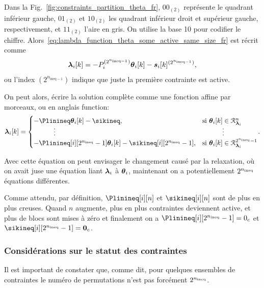 \documentclass[../main.tex]{subfiles}
\begin{document}
Dans la Fig.~\ref{fig:constraints_partition_theta_fr}, ${00}_{(2)}$ représente le quadrant inférieur gauche, ${01}_{(2)}$ et ${10}_{(2)}$ les quadrant inférieur droit et supérieur gauche, respectivement, et ${11}_{(2)}$ l'aire en gris.
On utilise la base 10 pour codifier le chiffre.
Alors~\eqref{eq:lambda_function_theta_some_active_same_size_fr} est récrit comme
\begin{equation}
  \label{eq:lambda_function_theta_same_size_coded}
  \lambdaik=-\Plin^{(2^{n_{\text{ineq}-1}})}\thetaik-\sik^{(2^{n_{\text{ineq}-1}})},
\end{equation}
ou l'index $(2^{n_{\text{ineq}-1}})$ indique que juste la première contrainte est active.

On peut alors, écrire la solution complète comme une fonction affine par morceaux, ou en anglais
\pwa{} function:
\begin{equation}
  \label{eq:lambdafuntheta_fr}
  \begin{aligned}
    \lambdaik=
    \begin{cases}
      -\Plinineq\thetaik-\sikineq,&\text{si}\ \thetaik \in\set{R}_{\lambdai}^{n}\\
      \qquad\quad \vdots&\qquad\quad \vdots\\
      -\Plinineq[i][2^{\nineq}-1]\thetaik-\sikineq[i][2^{\nineq}-1],&\text{si}\ \thetaik \in\set{R}_{\lambdai}^{2^{\nineq}-1}\\
    \end{cases}
  \end{aligned}.
\end{equation}

Avec cette équation on peut envisager le changement causé par la relaxation, où on avait juse une équation liant $\boldsymbol{\lambda}_{i}$ à $\boldsymbol{\theta}_{i}$, maintenant on a potentiellement $2^{n_{\text{ineq}}}$ équations différentes.

\begin{remark}\label{rem:sparse_solutions_fr}
  Comme attendu, par définition, $\Plinineq[i][n]$ et $\sikineq[i][n]$ sont de plus en plus creuses.
  Quand $n$ augmente, plus en plus contraintes deviennent active, et plus de blocs sont mises à zéro et finalement on a $\Plinineq[i][2^{\nineq}-1]=0_{c}$ et $\sikineq[i][2^{\nineq}-1]=\0_{c}$.
\end{remark}

\subsubsection{Considérations sur le statut des contraintes}\label{sec:cons-about-stat_fr}
Il est important de constater que, comme dit, pour quelques ensembles de contraintes le numéro de permutations n'est pas forcément $2^{n_{\text{ineq}}}$.
\end{document}
